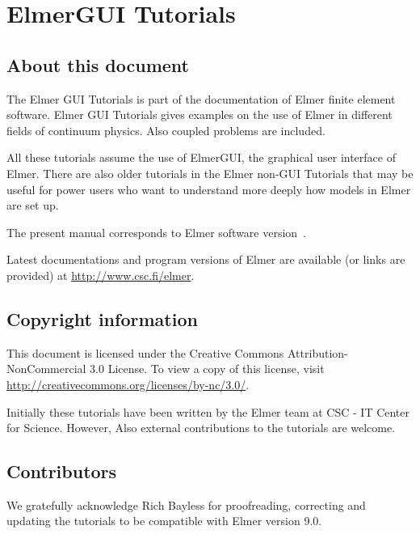 \chapter*{ElmerGUI Tutorials}

\section*{About this document}

The Elmer GUI Tutorials is part of the documentation of Elmer finite element software.
Elmer GUI Tutorials gives examples on the use of Elmer in different fields
of continuum physics. Also coupled problems are included. 

All these tutorials assume the use of ElmerGUI, the graphical user interface of 
Elmer. There are also older tutorials in the Elmer non-GUI Tutorials that 
may be useful for power users who want to understand more deeply 
how models in Elmer are set up.

The present manual corresponds to Elmer software version~\elmerversion{}.

Latest documentations and program versions of Elmer are available (or links are provided) at 
\url{http://www.csc.fi/elmer}. 

\section*{Copyright information}

This document is licensed under the Creative Commons Attribution-NonCommercial 3.0 License. 
To view a copy of this license, visit \url{http://creativecommons.org/licenses/by-nc/3.0/}.

Initially these tutorials have been written by the Elmer team at CSC - IT Center for Science.
However, Also external contributions to the tutorials are welcome.

\section*{Contributors}

We gratefully acknowledge Rich Bayless for proofreading, correcting and 
updating the tutorials to be compatible with Elmer version 9.0. 

